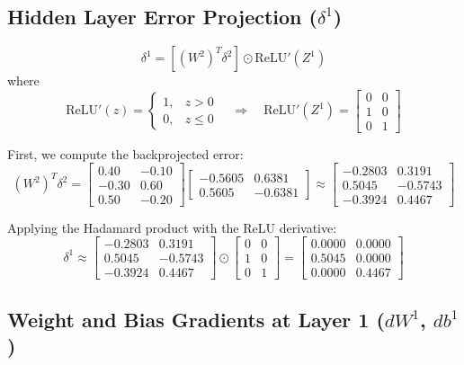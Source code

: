 \documentclass[11pt]{article}
\begin{document}
\subsection{Hidden Layer Error Projection (\texorpdfstring{$\delta^1$}{delta 1})}

\[
\delta^1 = \left[(W^2)^T \delta^2\right] \odot \text{ReLU}'(Z^1)
\]
where
\[
\text{ReLU}'(z) =
\begin{cases}
1, & z>0 \\
0, & z \le 0
\end{cases}
\quad\Longrightarrow\quad
\text{ReLU}'(Z^1) =
\begin{bmatrix} 0 & 0 \\ 1 & 0 \\ 0 & 1 \end{bmatrix}
\]

First, we compute the backprojected error:
\[
(W^2)^T \delta^2 = \begin{bmatrix} 0.40 & -0.10 \\ -0.30 & 0.60 \\ 0.50 & -0.20 \end{bmatrix} \begin{bmatrix} -0.5605 & 0.6381 \\ 0.5605 & -0.6381 \end{bmatrix} \approx \begin{bmatrix} -0.2803 & 0.3191 \\ 0.5045 & -0.5743 \\ -0.3924 & 0.4467 \end{bmatrix}
\]

Applying the Hadamard product with the ReLU derivative:
\[
\delta^1 \approx
\begin{bmatrix} -0.2803 & 0.3191 \\ 0.5045 & -0.5743 \\ -0.3924 & 0.4467 \end{bmatrix} \odot \begin{bmatrix} 0 & 0 \\ 1 & 0 \\ 0 & 1 \end{bmatrix} = \begin{bmatrix} 0.0000 & 0.0000 \\ 0.5045 & 0.0000 \\ 0.0000 & 0.4467 \end{bmatrix}
\]

\subsection{Weight and Bias Gradients at Layer 1 (\texorpdfstring{$dW^1$}{dW1}, \texorpdfstring{$db^1$}{db1})}
\end{document}
